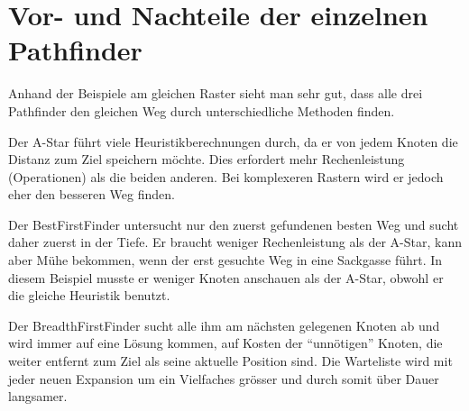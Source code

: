 \section{Vor- und Nachteile der einzelnen Pathfinder}

Anhand der Beispiele am gleichen Raster sieht man sehr gut, dass alle
drei Pathfinder den gleichen Weg durch unterschiedliche Methoden finden.

Der A-Star führt viele Heuristikberechnungen durch, da er von jedem
Knoten die Distanz zum Ziel speichern möchte. Dies erfordert mehr
Rechenleistung (Operationen) als die beiden anderen.
Bei komplexeren Rastern wird er jedoch eher den besseren Weg finden.

Der BestFirstFinder untersucht nur den zuerst gefundenen besten Weg und
sucht daher zuerst in der Tiefe. Er braucht weniger Rechenleistung als
der A-Star, kann aber Mühe bekommen, wenn der erst gesuchte Weg in eine
Sackgasse führt. In diesem Beispiel musste er weniger Knoten anschauen
als der A-Star, obwohl er die gleiche Heuristik benutzt.

Der BreadthFirstFinder sucht alle ihm am nächsten gelegenen Knoten ab
und wird immer auf eine Lösung kommen, auf Kosten der ``unnötigen''
Knoten, die weiter entfernt zum Ziel als seine aktuelle Position sind. Die
Warteliste wird mit jeder neuen Expansion um ein Vielfaches grösser und
durch somit über Dauer langsamer.
